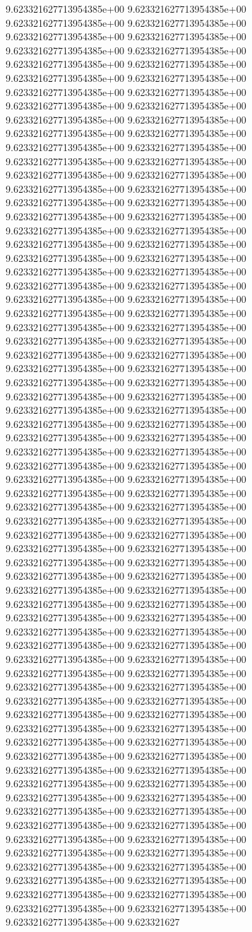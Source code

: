 9.623321627713954385e+00	9.623321627713954385e+00	9.623321627713954385e+00	9.623321627713954385e+00	9.623321627713954385e+00	9.623321627713954385e+00	9.623321627713954385e+00	9.623321627713954385e+00	9.623321627713954385e+00	9.623321627713954385e+00	9.623321627713954385e+00	9.623321627713954385e+00	9.623321627713954385e+00	9.623321627713954385e+00	9.623321627713954385e+00	9.623321627713954385e+00	9.623321627713954385e+00	9.623321627713954385e+00	9.623321627713954385e+00	9.623321627713954385e+00	9.623321627713954385e+00	9.623321627713954385e+00	9.623321627713954385e+00	9.623321627713954385e+00	9.623321627713954385e+00	9.623321627713954385e+00	9.623321627713954385e+00	9.623321627713954385e+00	9.623321627713954385e+00	9.623321627713954385e+00	9.623321627713954385e+00	9.623321627713954385e+00	9.623321627713954385e+00	9.623321627713954385e+00	9.623321627713954385e+00	9.623321627713954385e+00	9.623321627713954385e+00	9.623321627713954385e+00	9.623321627713954385e+00	9.623321627713954385e+00	9.623321627713954385e+00	9.623321627713954385e+00	9.623321627713954385e+00	9.623321627713954385e+00	9.623321627713954385e+00	9.623321627713954385e+00	9.623321627713954385e+00	9.623321627713954385e+00	9.623321627713954385e+00	9.623321627713954385e+00	9.623321627713954385e+00	9.623321627713954385e+00	9.623321627713954385e+00	9.623321627713954385e+00	9.623321627713954385e+00	9.623321627713954385e+00	9.623321627713954385e+00	9.623321627713954385e+00	9.623321627713954385e+00	9.623321627713954385e+00	9.623321627713954385e+00	9.623321627713954385e+00	9.623321627713954385e+00	9.623321627713954385e+00	9.623321627713954385e+00	9.623321627713954385e+00	9.623321627713954385e+00	9.623321627713954385e+00	9.623321627713954385e+00	9.623321627713954385e+00	9.623321627713954385e+00	9.623321627713954385e+00	9.623321627713954385e+00	9.623321627713954385e+00	9.623321627713954385e+00	9.623321627713954385e+00	9.623321627713954385e+00	9.623321627713954385e+00	9.623321627713954385e+00	9.623321627713954385e+00	9.623321627713954385e+00	9.623321627713954385e+00	9.623321627713954385e+00	9.623321627713954385e+00	9.623321627713954385e+00	9.623321627713954385e+00	9.623321627713954385e+00	9.623321627713954385e+00	9.623321627713954385e+00	9.623321627713954385e+00	9.623321627713954385e+00	9.623321627713954385e+00	9.623321627713954385e+00	9.623321627713954385e+00	9.623321627713954385e+00	9.623321627713954385e+00	9.623321627713954385e+00	9.623321627713954385e+00	9.623321627713954385e+00	9.623321627713954385e+00	9.623321627713954385e+00	9.623321627713954385e+00	9.623321627713954385e+00	9.623321627713954385e+00	9.623321627713954385e+00	9.623321627713954385e+00	9.623321627713954385e+00	9.623321627713954385e+00	9.623321627713954385e+00	9.623321627713954385e+00	9.623321627713954385e+00	9.623321627713954385e+00	9.623321627713954385e+00	9.623321627713954385e+00	9.623321627713954385e+00	9.623321627713954385e+00	9.623321627713954385e+00	9.623321627713954385e+00	9.623321627713954385e+00	9.623321627713954385e+00	9.623321627713954385e+00	9.623321627713954385e+00	9.623321627713954385e+00	9.623321627713954385e+00	9.623321627713954385e+00	9.623321627713954385e+00	9.623321627713954385e+00	9.623321627713954385e+00	9.623321627713954385e+00	9.623321627713954385e+00	9.623321627713954385e+00	9.623321627713954385e+00	9.623321627713954385e+00	9.623321627